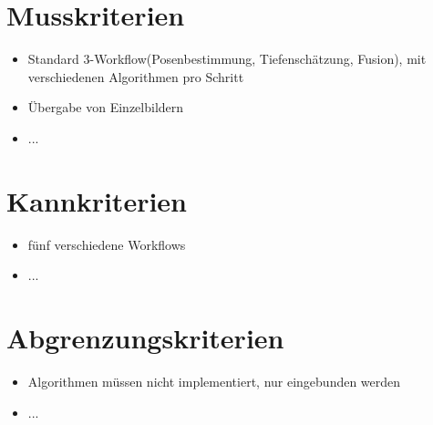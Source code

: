 
\section{Musskriterien}
\begin{itemize}
	\item Standard 3-Workflow(Posenbestimmung, Tiefenschätzung, Fusion), mit verschiedenen Algorithmen pro Schritt
	\item Übergabe von Einzelbildern
	\item ...
\end{itemize}

\section{Kannkriterien}
\begin{itemize}
	\item fünf verschiedene Workflows
	\item ...
\end{itemize}

\section{Abgrenzungskriterien}
\begin{itemize}
	\item Algorithmen müssen nicht implementiert, nur eingebunden werden
	\item ...
\end{itemize}
